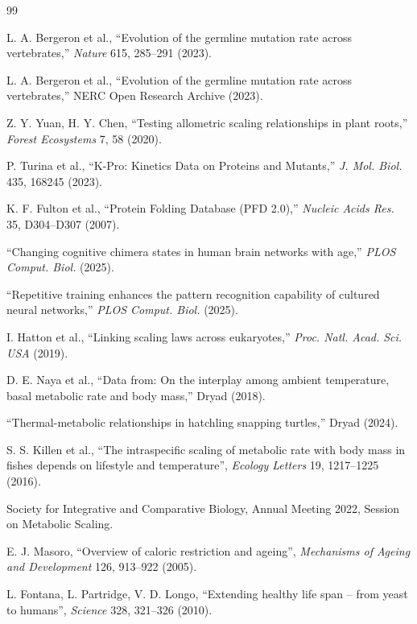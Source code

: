\documentclass[11pt]{article}
\begin{document}
	\begin{thebibliography}{99}
		
		L. A. Bergeron et al., ``Evolution of the germline mutation rate across vertebrates,'' \emph{Nature} 615, 285–291 (2023).
		
		L. A. Bergeron et al., ``Evolution of the germline mutation rate across vertebrates,'' NERC Open Research Archive (2023).
		
		Z. Y. Yuan, H. Y. Chen, ``Testing allometric scaling relationships in plant roots,'' \emph{Forest Ecosystems} 7, 58 (2020).
		
		P. Turina et al., ``K-Pro: Kinetics Data on Proteins and Mutants,'' \emph{J. Mol. Biol.} 435, 168245 (2023).
		
		K. F. Fulton et al., ``Protein Folding Database (PFD 2.0),'' \emph{Nucleic Acids Res.} 35, D304–D307 (2007).
		
		``Changing cognitive chimera states in human brain networks with age,'' \emph{PLOS Comput. Biol.} (2025).
		
		``Repetitive training enhances the pattern recognition capability of cultured neural networks,'' \emph{PLOS Comput. Biol.} (2025).
		
		I. Hatton et al., ``Linking scaling laws across eukaryotes,'' \emph{Proc. Natl. Acad. Sci. USA} (2019).
		
		D. E. Naya et al., ``Data from: On the interplay among ambient temperature, basal metabolic rate and body mass,'' Dryad (2018).
		
		``Thermal-metabolic relationships in hatchling snapping turtles,'' Dryad (2024).
		
		S. S. Killen et al., ``The intraspecific scaling of metabolic rate with body mass in fishes depends on lifestyle and temperature'', \emph{Ecology Letters} 19, 1217–1225 (2016).
		
		Society for Integrative and Comparative Biology, Annual Meeting 2022, Session on Metabolic Scaling.
		
		E. J. Masoro, ``Overview of caloric restriction and ageing'', \emph{Mechanisms of Ageing and Development} 126, 913–922 (2005).
		
		L. Fontana, L. Partridge, V. D. Longo, ``Extending healthy life span – from yeast to humans'', \emph{Science} 328, 321–326 (2010).
		

\end{thebibliography}
\end{document}
